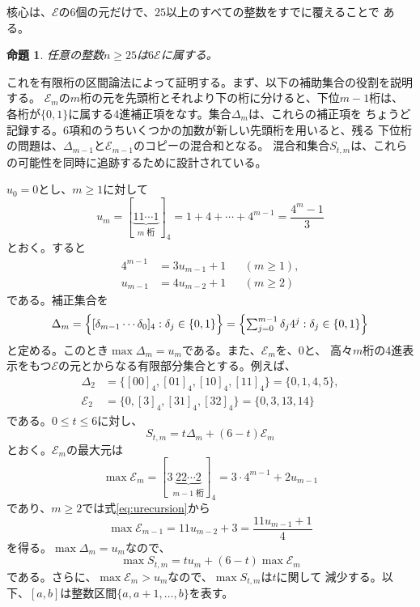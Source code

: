 \documentclass[12pt]{ltjsarticle}
\theoremstyle{plain}
\newtheorem{proposition}[theorem]{命題}
\begin{document}
核心は、$\mathcal E$の6個の元だけで、$25$以上のすべての整数をすでに覆えることで
ある。

\begin{proposition}\label{prop:E}
任意の整数$n\geq25$は$6\mathcal E$に属する。
\end{proposition}

これを有限桁の区間論法によって証明する。まず、以下の補助集合の役割を説明する。
$\mathcal E_m$の$m$桁の元を先頭桁とそれより下の桁に分けると、下位$m-1$桁は、
各桁が$\{0,1\}$に属する4進補正項をなす。集合$\Delta_m$は、これらの補正項を
ちょうど記録する。6項和のうちいくつかの加数が新しい先頭桁を用いると、残る
下位桁の問題は、$\Delta_{m-1}$と$\mathcal E_{m-1}$のコピーの混合和となる。
混合和集合$S_{t,m}$は、これらの可能性を同時に追跡するために設計されている。

$u_0=0$とし、$m\geq1$に対して
\begin{equation}\label{eq:umdef}
 u_m=[\underbrace{11\cdots1}_{m\text{ 桁}}]_4
    =1+4+\cdots+4^{m-1}=\frac{4^m-1}{3}
\end{equation}
とおく。すると
\begin{equation}\label{eq:urecursion}
\begin{aligned}
 4^{m-1}&=3u_{m-1}+1 &&(m\geq1),\\
 u_{m-1}&=4u_{m-2}+1 &&(m\geq2)
\end{aligned}
\end{equation}
である。補正集合を
\[
 \Delta_m=\Bigl\{[\delta_{m-1}\cdots\delta_0]_4:\delta_j\in\{0,1\}\Bigr\}
    =\Bigl\{\textstyle\sum_{j=0}^{m-1}\delta_j4^j:\delta_j\in\{0,1\}\Bigr\}
\]
と定める。このとき$\max\Delta_m=u_m$である。また、$\mathcal E_m$を、$0$と、
高々$m$桁の4進表示をもつ$\mathcal E$の元とからなる有限部分集合とする。例えば、
\[
\begin{aligned}
 \Delta_2&=\{[00]_4,[01]_4,[10]_4,[11]_4\}=\{0,1,4,5\},\\
 \mathcal E_2&=\{0,[3]_4,[31]_4,[32]_4\}=\{0,3,13,14\}
\end{aligned}
\]
である。$0\leq t\leq6$に対し、
\[
        S_{t,m}=t\Delta_m+(6-t)\mathcal E_m
\]
とおく。$\mathcal E_m$の最大元は
\[
 \max\mathcal E_m=[3\underbrace{22\cdots2}_{m-1\text{ 桁}}]_4
                =3\cdot4^{m-1}+2u_{m-1}
\]
であり、$m\geq2$では式\eqref{eq:urecursion}から
\begin{equation}\label{eq:maxErecursion}
 \max\mathcal E_{m-1}=11u_{m-2}+3=\frac{11u_{m-1}+1}{4}
\end{equation}
を得る。$\max\Delta_m=u_m$なので、
\begin{equation}\label{eq:maxStm}
 \max S_{t,m}=tu_m+(6-t)\max\mathcal E_m
\end{equation}
である。さらに、$\max\mathcal E_m>u_m$なので、$\max S_{t,m}$は$t$に関して
減少する。以下、$[a,b]$は整数区間$\{a,a+1,\ldots,b\}$を表す。
\end{document}
